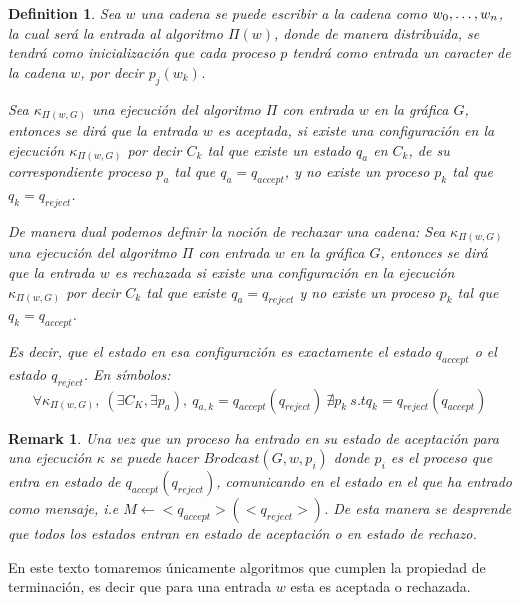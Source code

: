 \documentclass[10pt]{report}
\newtheorem*{remark}{Remark}
\newtheorem{definition}{Definition}
\begin{document}
    \theoremstyle{definition}
    \begin{definition}
        Sea $w$ una cadena se puede escribir a la cadena como $w_{0},\mathellipsis, w_{n}$, la cual será la entrada al algoritmo
        $\Pi(w)$, donde de manera distribuida, se tendrá como inicialización que cada proceso $p$ tendrá como entrada un caracter de la cadena $w$, por decir $p_{j}(w_{k})$.\newline

        Sea $\kappa_{\Pi(w,G)}$ una ejecución del algoritmo $\Pi$ con entrada $w$ en la gráfica $G$, entonces se dirá que
        la entrada $w$ es aceptada, si existe una configuración en la ejecución $\kappa_{\Pi(w,G)}$ por decir $C_{k}$ tal que
        existe un estado $q_{a}$ en $C_{k}$, de su correspondiente proceso $p_{a}$ tal que $q_{a}=q_{accept}$,
        y no existe un proceso $p_{k}$ tal que $q_{k} = q_{reject}$.\newline

        De manera dual podemos definir la noción de rechazar una cadena:\newline
        Sea $\kappa_{\Pi(w,G)}$ una ejecución del algoritmo $\Pi$ con entrada $w$ en la gráfica $G$, entonces se dirá que
        la entrada $w$ es rechazada si existe una configuración en la ejecución $\kappa_{\Pi(w,G)}$ por decir $C_{k}$ tal que
        existe $q_{a} = q_{reject}$ y no existe un proceso $p_{k}$ tal que $q_{k} = q_{accept}$.\newline


        Es decir, que el estado en esa configuración es exactamente el estado $q_{accept}$ o el estado $q_{reject}$.\newline
        En símbolos:
        \begin{equation}
            \forall \kappa_{\Pi(w,G)},\ (\exists C_{K},\exists p_{a}),\ q_{a,k}=q_{accept}(q_{reject}) \ \nexists p_{k} \ s.t q_{k} = q_{reject}(q_{accept}) \label{eq:equation4}
        \end{equation}
    \end{definition}

    \begin{remark}
        Una vez que un proceso ha entrado en su estado de aceptación para una ejecución $\kappa$
        se puede hacer $Brodcast(G,w,p_{i})$ donde $p_{i}$ es el proceso que entra en estado de $q_{accept}(q_{reject})$,
        comunicando en el estado en el que ha entrado como mensaje, i.e $M \leftarrow <q_{accept}>(<q_{reject}>)$.\newline
        De esta manera se desprende que todos los estados entran en estado de aceptación o en estado de rechazo.
    \end{remark}
    En este texto tomaremos únicamente algoritmos que cumplen la propiedad de terminación,
    es decir que para una entrada $w$ esta es aceptada o rechazada.\newline
\end{document}
